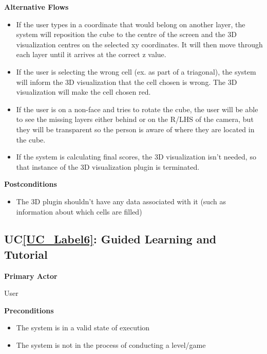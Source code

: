 \documentclass[12pt]{article}
\newcounter{ucnum} %
\newcommand{\ucref}[1]{UC\ref{#1}}
\begin{document}
\textbf{Alternative Flows}
\begin{itemize}
\item If the user types in a coordinate that would belong on another layer, the system will reposition the cube to the centre of the screen and the 3D visualization centres on the selected xy coordinates. It will then move through each layer until it arrives at the correct z value.
\item If the user is selecting the wrong cell (ex. as part of a triagonal), the system will inform the 3D visualization that the cell chosen is wrong. The 3D visualization will make the cell chosen red.
\item If the user is on a non-face and tries to rotate the cube, the user will be able to see the missing layers either behind or on the R/LHS of the camera, but they will be transparent so the person is aware of where they are located in the cube.
\item If the system is calculating final scores, the 3D visualization isn't needed, so that instance of the 3D visualization plugin is terminated.
\end{itemize}

\textbf{Postconditions}
\begin{itemize}
\item The 3D plugin shouldn't have any data associated with it (such as information about which cells are filled)
\end{itemize}

 \label{UC_Label6}
\subsection{\ucref{UC_Label6}: Guided Learning and Tutorial}

\textbf{Primary Actor}

User

\textbf{Preconditions}
\begin{itemize}
\item The system is in a valid state of execution
\item The system is not in the process of conducting a level/game
\end{itemize}
\end{document}
